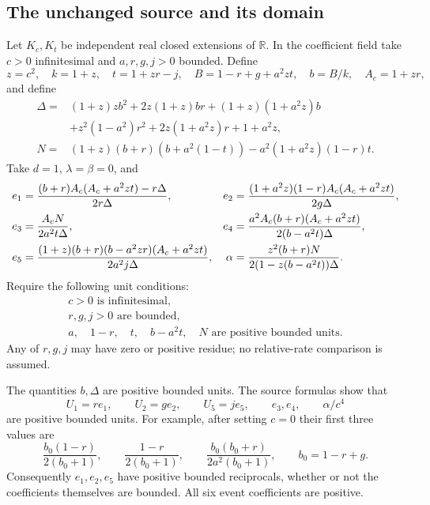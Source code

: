 \subsection{The unchanged source and its domain}
Let $K_c,K_t$ be independent real closed extensions of $\mathbb R$.
In the coefficient field take $c>0$ infinitesimal and $a,r,g,j>0$ bounded.
Define
\[
 z=c^2,\quad k=1+z,\quad t=1+zr-j,\quad
 B=1-r+g+a^2zt,\quad b=B/k,\quad A_c=1+zr,
\]
and define
\begin{align*}
\Delta={}&(1+z)zb^2+2z(1+z)br+(1+z)(1+a^2z)b\\
 &+z^2(1-a^2)r^2+2z(1+a^2z)r+1+a^2z,\\
N={}&(1+z)(b+r)(b+a^2(1-t))-a^2(1+a^2z)(1-r)t.
\end{align*}
Take $d=1$, $\lambda=\beta=0$, and
\begin{align}
e_1&=\frac{(b+r)A_c(A_c+a^2zt)-r\Delta}{2r\Delta},&
e_2&=\frac{(1+a^2z)(1-r)A_c(A_c+a^2zt)}{2g\Delta},\notag\\
e_3&=\frac{A_cN}{2a^2t\Delta},&
e_4&=\frac{a^2A_c(b+r)(A_c+a^2zt)}{2(b-a^2t)\Delta},\notag\\
e_5&=\frac{(1+z)(b+r)(b-a^2zr)(A_c+a^2zt)}{2a^2j\Delta},&
\alpha&=\frac{z^2(b+r)N}{2(1-z(b-a^2t))\Delta}.
\label{p9f1235511111:eq:c2u-source}
\end{align}
Require the following unit conditions:
\begin{equation}
\begin{gathered}
c>0\text{ is infinitesimal},\\
r,g,j>0\text{ are bounded},\\
a,\quad 1-r,\quad t,\quad b-a^2t,\quad N
\text{ are positive bounded units}.
\end{gathered}\label{p9f1235511111:eq:c2u-hyp}
\end{equation}
Any of $r,g,j$ may have zero or positive residue; no relative-rate
comparison is assumed.

The quantities $b,\Delta$ are positive bounded units.  The source formulas
show that
\begin{equation}
U_1=re_1,\qquad U_2=ge_2,\qquad U_5=je_5,
\qquad e_3,e_4,\qquad \alpha/c^4
\label{p9f1235511111:eq:c2u-units}
\end{equation}
are positive bounded units.  For example, after setting $c=0$ their
first three values are
\[
\frac{b_0(1-r)}{2(b_0+1)},\qquad
\frac{1-r}{2(b_0+1)},\qquad
\frac{b_0(b_0+r)}{2a^2(b_0+1)},\qquad b_0=1-r+g.
\]
Consequently $e_1,e_2,e_5$ have positive bounded reciprocals, whether or
not the coefficients themselves are bounded.  All six event coefficients
are positive.

